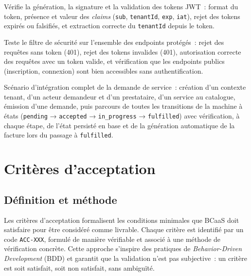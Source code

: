 \begin{description}[leftmargin=0.5cm]
  \item[\textbf{JwtServiceTest}]
    Vérifie la génération, la signature et la validation des tokens JWT~: format du token,
    présence et valeur des \textit{claims} (\texttt{sub}, \texttt{tenantId}, \texttt{exp},
    \texttt{iat}), rejet des tokens expirés ou falsifiés, et extraction correcte du
    \texttt{tenantId} depuis le token.

  \item[\textbf{SecurityIntegrationTest}]
    Teste le filtre de sécurité sur l'ensemble des endpoints protégés~: rejet des requêtes
    sans token (401), rejet des tokens invalides (401), autorisation correcte des requêtes
    avec un token valide, et vérification que les endpoints publics (inscription, connexion)
    sont bien accessibles sans authentification.

  \item[\textbf{ServiceRequestIntegrationTest}]
    Scénario d'intégration complet de la demande de service~: création d'un contexte tenant,
    d'un acteur demandeur et d'un prestataire, d'un service au catalogue, émission d'une
    demande, puis parcours de toutes les transitions de la machine à états
    (\texttt{pending} → \texttt{accepted} → \texttt{in\_progress} → \texttt{fulfilled})
    avec vérification, à chaque étape, de l'état persisté en base et de la génération
    automatique de la facture lors du passage à \texttt{fulfilled}.
\end{description}

\section{Critères d'acceptation}
\label{sec:criteres-acceptation}

\subsection{Définition et méthode}
\label{subsec:criteres-def}

Les critères d'acceptation formalisent les conditions minimales que BCaaS doit satisfaire
pour être considéré comme livrable. Chaque critère est identifié par un code
\texttt{ACC-XXX}, formulé de manière vérifiable et associé à une méthode de vérification
concrète. Cette approche s'inspire des pratiques de \textit{Behavior-Driven Development}
(BDD) et garantit que la validation n'est pas subjective~: un critère est soit satisfait,
soit non satisfait, sans ambiguïté.

